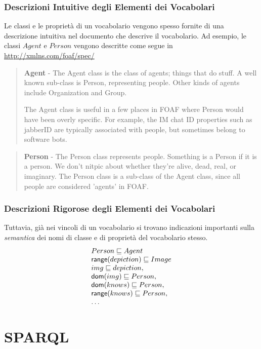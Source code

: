 \documentclass[8pt]{beamer}
\begin{document}
\begin{frame}
\frametitle{Descrizioni Intuitive degli Elementi dei Vocabolari}
	Le classi e le propriet\`a di un vocabolario vengono spesso fornite
	di una descrizione intuitiva nel documento che descrive il vocabolario.
	Ad esempio, le classi $Agent$ e $Person$ vengono descritte come segue
	in \url{http://xmlns.com/foaf/spec/}
	\begin{quote}
		\textbf{Agent} - The Agent class is the class of agents; things that do stuff. A well known
		sub-class is Person, representing people. Other kinds of agents include
		Organization and Group.
		
		The Agent class is useful in a few places in FOAF where Person would have
		been overly specific. For example, the IM chat ID properties such as
		jabberID are typically associated with people, but sometimes belong to
		software bots.
	\end{quote}

	\begin{quote}
		\textbf{Person} - The Person class represents people. Something is a Person if it is a person.
		We don't nitpic about whether they're alive, dead, real, or imaginary.
		The Person class is a sub-class of the Agent class, since all people are
		considered 'agents' in FOAF.
	\end{quote}
\end{frame}

\begin{frame}
\frametitle{Descrizioni Rigorose degli Elementi dei Vocabolari}
	Tuttavia, gi\`a nei vincoli di un vocabolario si trovano indicazioni importanti
	sulla \emph{semantica} dei nomi di classe e di propriet\`a del vocabolario stesso.
	\[
	\begin{array}{l}
	Person \sqsubseteq Agent\\
	\mathsf{range}(depiction) \sqsubseteq Image\\
	img \sqsubseteq depiction, \\
	\mathsf{dom}(img) \sqsubseteq Person,\\
	\mathsf{dom}(knows) \sqsubseteq Person,\\
	\mathsf{range}(knows) \sqsubseteq Person,\\
	\ldots
	\end{array}
	\]
\end{frame}

\section{SPARQL}
\end{document}
